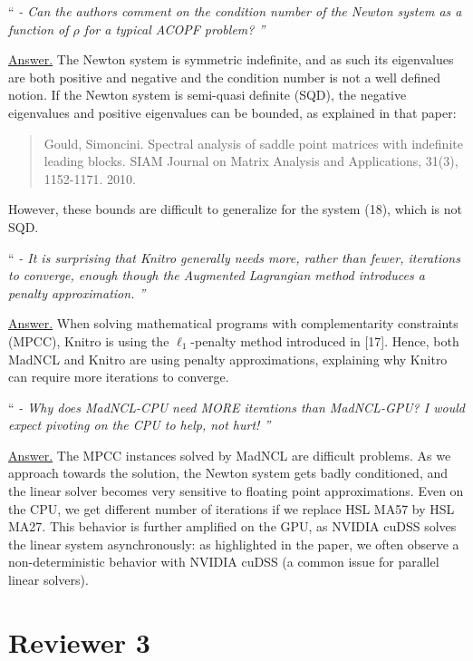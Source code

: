 \documentclass[10pt,a4paper]{article}
\newenvironment{quotereviewer}{\vspace{.5cm}{\underline\reviewername} ``\it\footnotesize}{''}
\newcommand{\answer}{\vspace{1mm}\underline{Answer.} }
\begin{document}
\begin{quotereviewer}
- Can the authors comment on the condition number of the Newton system as a function of $\rho$ for a typical ACOPF problem?
\end{quotereviewer}

\answer
The Newton system is symmetric indefinite, and as such its eigenvalues are both
positive and negative and the condition number is not a well defined notion.
If the Newton system is semi-quasi definite (SQD), the negative
eigenvalues and positive eigenvalues can be bounded, as explained in that paper:
\begin{quote}
  Gould,  Simoncini. Spectral analysis of saddle point matrices with indefinite leading blocks. SIAM Journal on Matrix Analysis and Applications, 31(3), 1152-1171. 2010.
\end{quote}
However, these bounds are difficult to generalize for the system (18), which is not SQD.


\begin{quotereviewer}
- It is surprising that Knitro generally needs more, rather than fewer, iterations to converge, enough though the Augmented Lagrangian method introduces a penalty approximation.
\end{quotereviewer}

\answer
When solving mathematical programs with complementarity constraints (MPCC), Knitro
is using the $\ell_1$-penalty method introduced in [17]. Hence, both MadNCL and
Knitro are using penalty approximations, explaining why Knitro can
require more iterations to converge.

\begin{quotereviewer}
- Why does MadNCL-CPU need MORE iterations than MadNCL-GPU? I would expect pivoting on the CPU to help, not hurt!
\end{quotereviewer}

\answer
The MPCC instances solved by MadNCL are difficult problems.
As we approach towards the solution, the Newton system gets badly conditioned,
and the linear solver becomes very sensitive to floating point approximations. Even on the CPU,
we get different number of iterations if we replace HSL MA57 by HSL MA27.
This behavior is further amplified on the GPU, as NVIDIA cuDSS solves the linear
system asynchronously: as highlighted in the paper, we often observe a non-deterministic
behavior with NVIDIA cuDSS (a common issue for parallel linear solvers).

\section{Reviewer 3}
\def\reviewername{Reviewer~\#3}
\bigskip
\end{document}
